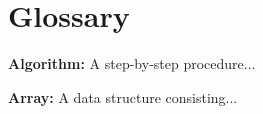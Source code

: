 \backmatter

\pagestyle{backmatter}

\printbibliography
{}

\chapter*{Glossary}

\begin{multicols}{2}
	\textbf{Algorithm:} A step-by-step procedure...
	
	\textbf{Array:} A data structure consisting...
	
\end{multicols}

\printindex
{}
